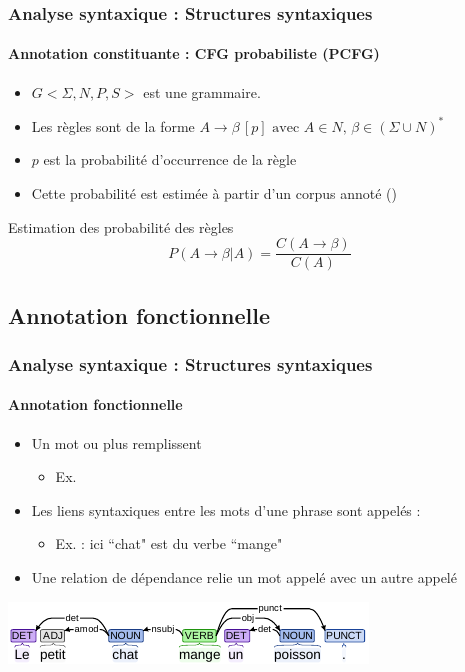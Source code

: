 \documentclass[xcolor=table]{beamer}
\begin{document}
\begin{frame}
\frametitle{Analyse syntaxique : Structures syntaxiques}
\framesubtitle{Annotation constituante : CFG probabiliste (PCFG)}

\begin{itemize}
	\item $G <\Sigma, N, P, S>$ est une grammaire.
	\item Les règles sont de la forme $A \rightarrow \beta\, [p] \text{ avec } A \in N,\, \beta \in (\Sigma \cup N)^*$
	\item $p$ est la probabilité d'occurrence de la règle
	\item Cette probabilité est estimée à partir d'un corpus annoté ()
\end{itemize}

\begin{block}{Estimation des probabilité des règles}
	\[
	P(A \rightarrow \beta | A) = \frac{C(A \rightarrow \beta)}{C(A)}
	\]
\end{block}

\end{frame}

\subsection{Annotation fonctionnelle}

\begin{frame}
\frametitle{Analyse syntaxique : Structures syntaxiques}
\framesubtitle{Annotation fonctionnelle}

\begin{itemize}
	\item Un mot ou plus remplissent 
	\begin{itemize}
		\item Ex. 
	\end{itemize}
	\item Les liens syntaxiques entre les mots d'une phrase sont appelés : 
	\begin{itemize}
		\item Ex.  : ici ``chat" est  du verbe ``mange"
	\end{itemize}
	\item Une relation de dépendance relie un mot appelé  avec un autre appelé 
\end{itemize}

\includegraphics[width=\textwidth]{../img/intro/gram-dep_.pdf}

\end{frame}
\end{document}
